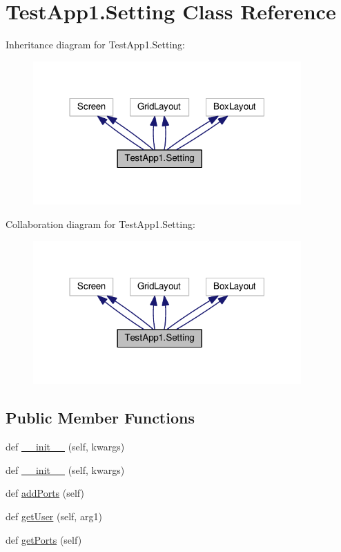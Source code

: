 \hypertarget{classTestApp1_1_1Setting}{}\section{Test\+App1.\+Setting Class Reference}
\label{classTestApp1_1_1Setting}


Inheritance diagram for Test\+App1.\+Setting\+:
\nopagebreak
\begin{figure}[H]
\begin{center}
\leavevmode
\includegraphics[width=291pt]{classTestApp1_1_1Setting__inherit__graph}
\end{center}
\end{figure}


Collaboration diagram for Test\+App1.\+Setting\+:
\nopagebreak
\begin{figure}[H]
\begin{center}
\leavevmode
\includegraphics[width=291pt]{classTestApp1_1_1Setting__coll__graph}
\end{center}
\end{figure}
\subsection*{Public Member Functions}
\begin{DoxyCompactItemize}
\item 
def \hyperlink{classTestApp1_1_1Setting_a74bad58507816fbeaff1fc4179897de7}{\+\_\+\+\_\+init\+\_\+\+\_\+} (self, kwargs)
\item 
def \hyperlink{classTestApp1_1_1Setting_a74bad58507816fbeaff1fc4179897de7}{\+\_\+\+\_\+init\+\_\+\+\_\+} (self, kwargs)
\item 
def \hyperlink{classTestApp1_1_1Setting_a93ff4a112c0ea2d7fbb741294fbe84e4}{add\+Ports} (self)
\item 
def \hyperlink{classTestApp1_1_1Setting_af372ec2bb98248f237bc11e3b789966f}{get\+User} (self, arg1)
\item 
def \hyperlink{classTestApp1_1_1Setting_ace2d3903967a735e697a106e65e91ef9}{get\+Ports} (self)
\end{DoxyCompactItemize}
